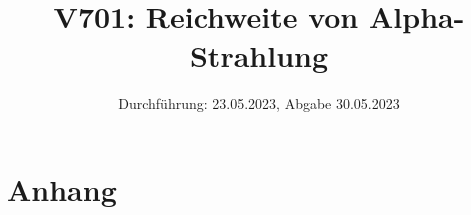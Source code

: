 

\title{V701: Reichweite von Alpha-Strahlung}
\date{Durchführung: 23.05.2023, Abgabe 30.05.2023}


\maketitle
\thispagestyle{empty} 
\tableofcontents
\newpage
\setcounter{page}{1}






\printbibliography
\newpage

\section*{Anhang}

